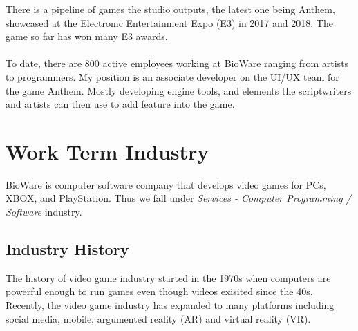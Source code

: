 \documentclass[10pt,letterpaper]{article}
\begin{document}
There is a pipeline of games the studio outputs, the latest one being Anthem, showcased at the Electronic Entertainment Expo (E3) in 2017 and 2018. The game so far has won many E3 awards.\\
\\
To date, there are 800 active employees working at BioWare ranging from artists to programmers. My position is an associate developer on the UI/UX team for the game Anthem. Mostly developing engine tools, and elements the scriptwriters and artists can then use to add feature into the game. \\

\section{Work Term Industry}\label{work-term-industry}


BioWare is computer software company that develops video games for PCs, XBOX, and PlayStation. Thus we fall under \textit{Services - Computer Programming / Software} industry. 

\subsection{Industry History}

The history of video game industry started in the 1970s when computers are powerful enough to run games even though videos exisited since the 40s. Recently, the video game industry has expanded to many platforms including social media, mobile, argumented reality (AR) and virtual reality (VR).\cite{video-game-industry-wiki}\cite{video-game-industry-stats}\\
\end{document}
